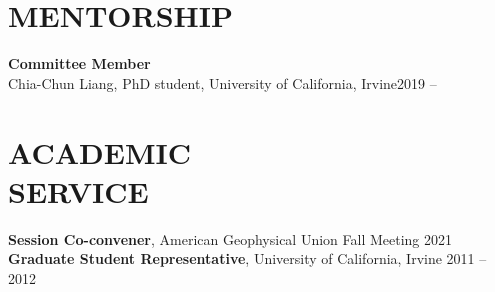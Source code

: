 \documentclass[margin,line,11pt]{res}
\begin{document}
\begin{resume}
\section{MENTORSHIP}
	{\bf Committee Member}\\
	Chia-Chun Liang, PhD student, University of California, Irvine\hfill2019 --\\

\section{ACADEMIC\\SERVICE}
	{\bf Session Co-convener}, American Geophysical Union Fall Meeting \hfill2021\\
	{\bf Graduate Student Representative}, University of California, Irvine \hfill 2011 -- 2012 \\


\end{resume}
\end{document}
